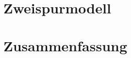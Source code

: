 \documentclass{like}
\begin{document}
\section{Zweispurmodell}
\section{Zusammenfassung}



\appendix





%



%


\end{document}
